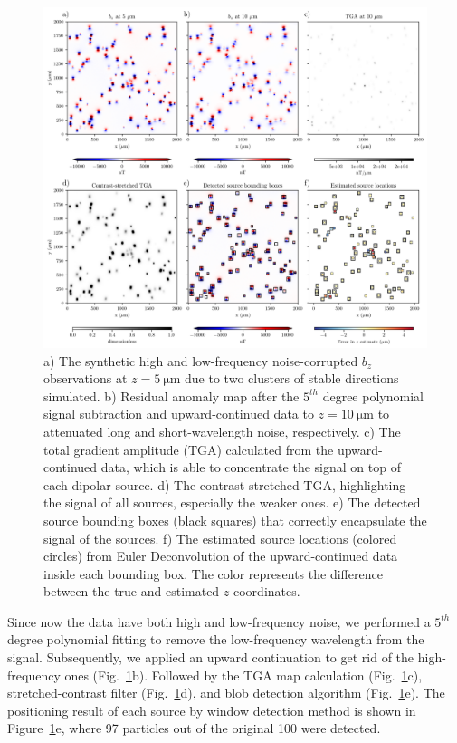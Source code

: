 \begin{figure}[t]
  \centering
  \includegraphics[width=1\linewidth]{figures/complex-synthetic-data.png}
  \caption{
    a) The synthetic high and low-frequency noise-corrupted $b_z$ observations at 
    $z = \qty{5}{\micro\meter}$ due to two clusters of stable directions simulated. 
    b) Residual anomaly map after the $5^{th}$ degree polynomial signal subtraction and upward-continued data to $z = \qty{10}{\micro\meter}$ to attenuated long and short-wavelength noise, respectively.
    c) The total gradient amplitude (TGA) calculated from the 
    upward-continued data, which is able to concentrate the signal on top
    of each dipolar source. 
    d) The contrast-stretched TGA, highlighting the signal of all sources, especially the weaker ones.
    e) The detected source bounding boxes (black squares) that correctly
    encapsulate the signal of the sources.
    f) The estimated source locations (colored circles) from Euler 
    Deconvolution of the upward-continued data inside each bounding box. 
    The color represents the difference between the true and estimated 
    $z$ coordinates.
  }
  \label{complex-synthetic-data}
\end{figure}

Since now the data have both high and low-frequency noise, we performed a $5^{th}$ degree polynomial fitting to remove the low-frequency wavelength from the signal. Subsequently, we applied an upward continuation to get rid of the high-frequency ones (Fig.~\ref{complex-synthetic-data}b). Followed by the TGA map calculation (Fig.~\ref{complex-synthetic-data}c), stretched-contrast filter (Fig.~\ref{complex-synthetic-data}d), and blob detection algorithm (Fig.~\ref{complex-synthetic-data}e). The positioning result of each source by window detection method is shown in Figure~\ref{complex-synthetic-data}e, where 97 particles out of the original 100 were detected. 

